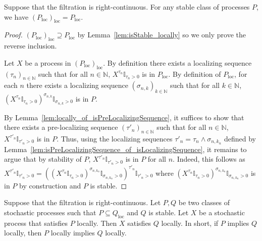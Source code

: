 \begin{lemma}\label{lem:locally_locally}
  \mathlibok
Suppose that the filtration is right-continuous.
For any stable class of processes $P$, we have $(P_{\mathrm{loc}})_{\mathrm{loc}} = P_{\mathrm{loc}}$.
\end{lemma}

\begin{proof}\leanok
$(P_{\mathrm{loc}})_{\mathrm{loc}} \supseteq P_{\mathrm{loc}}$ by Lemma~\ref{lem:isStable_locally} so we only prove the reverse inclusion.

Let $X$ be a process in $(P_{\mathrm{loc}})_{\mathrm{loc}}$.
By definition there exists a localizing sequence $(\tau_n)_{n \in \mathbb{N}}$ such that for all $n \in \mathbb{N}$, $X^{\tau_n}\mathbb{I}_{\tau_n > 0}$ is in $P_{\mathrm{loc}}$.
By definition of $P_{\mathrm{loc}}$, for each $n$ there exists a localizing sequence $(\sigma_{n,k})_{k \in \mathbb{N}}$ such that for all $k \in \mathbb{N}$, $(X^{\tau_n}\mathbb{I}_{\tau_n > 0})^{\sigma_{n,k}}\mathbb{I}_{\sigma_{n,k} > 0}$ is in $P$.

By Lemma~\ref{lem:locally_of_isPreLocalizingSequence}, it suffices to show that there exists a pre-localizing sequence $(\tau'_n)_{n \in \mathbb{N}}$ such that for all $n \in \mathbb{N}$, $X^{\tau'_n}\mathbb{I}_{\tau'_n > 0}$ is in $P$.
Thus, using the localizing sequences $\tau'_n = \tau_n \wedge \sigma_{n, k_n}$ defined by Lemma~\ref{lem:isPreLocalizingSequence_of_isLocalizingSequence},
it remains to argue that by stability of $P$, $X^{\tau'_n}\mathbb{I}_{\tau'_n > 0}$ is in $P$ for all $n$.
Indeed, this follows as $X^{\tau'_n}\mathbb{I}_{\tau'_n > 0} = ((X^{\tau_n}\mathbb{I}_{\tau_n > 0})^{\sigma_{n,k_n}}\mathbb{I}_{\sigma_{n,k_n} > 0})^{\tau'_n}\mathbb{I}_{\tau'_n > 0}$ where $(X^{\tau_n}\mathbb{I}_{\tau_n > 0})^{\sigma_{n,k_n}}\mathbb{I}_{\sigma_{n,k_n} > 0}$ is in $P$ by construction and $P$ is stable.
\end{proof}


\begin{lemma}\label{lem:local_induction}
  \mathlibok
Suppose that the filtration is right-continuous.
Let $P, Q$ be two classes of stochastic processes such that $P \subseteq Q_{\mathrm{loc}}$ and $Q$ is stable.
Let $X$ be a stochastic process that satisfies $P$ locally.
Then $X$ satisfies $Q$ locally.
In short, if $P$ implies $Q$ locally, then $P$ locally implies $Q$ locally.
\end{lemma}

